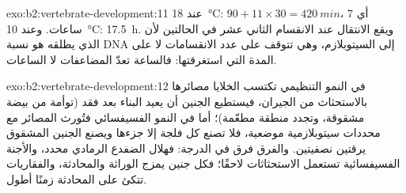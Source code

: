 \begin{solution}{exo:b2:vertebrate-development:11}
عند \qty{18}{\celsius}: $90 + 11\times 30 = \qty{420}{min}$، أي 7 ساعات.
وعند \qty{10}{\celsius}: \qty{17.5}{h}. ويقع الانتقال عند
الانقسام الثاني عشر في الحالتين لأن الذي يطلقه هو
نسبة DNA إلى السيتوبلازم، وهي تتوقف على عدد الانقسامات
لا على المدة التي استغرقتها: فالساعة تعدّ المضاعفات لا
الساعات.
\end{solution}

\begin{solution}{exo:b2:vertebrate-development:12}
في النمو التنظيمي تكتسب الخلايا مصائرها بالاستحثاث
من الجيران، فيستطيع الجنين أن يعيد البناء بعد فقد (توأمة من
بيضة مشقوقة، وتجدد منطقة مطعّمة)؛ أما في النمو
الفسيفسائي فتُورث المصائر مع محددات سيتوبلازمية
موضعية، فلا تصنع كل فلجة إلا جزءها ويصنع الجنين المشقوق
يرقتين نصفيتين. والفرق فرق في الدرجة: فهلال الضفدع
الرمادي محدد، والأجنة الفسيفسائية تستعمل
الاستحثاثات لاحقًا؛ فكل جنين يمزج الوراثة والمحادثة،
والفقاريات تتكئ على المحادثة زمنًا أطول.
\end{solution}

